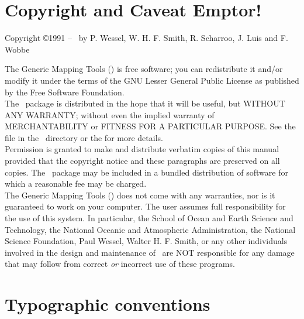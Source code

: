 
\chapter*{Copyright and Caveat Emptor!}

\begin{center}
Copyright \copyright 1991 -- \GMTDOCYEAR\ by P. Wessel, W. H. F. Smith, R. Scharroo, J. Luis and F. Wobbe
\end{center}

\vspace{\baselineskip}

The Generic Mapping Tools (\GMT) is free software; you can redistribute
it and/or modify it under the terms of the GNU Lesser General Public License
as published by the Free Software Foundation. \\

The \GMT\ package is distributed in the hope that it will be useful, but
WITHOUT ANY WARRANTY; without even the implied warranty of
MERCHANTABILITY or FITNESS FOR A PARTICULAR PURPOSE.  See the
file  in the \GMT\ directory or the
for more details. \\

Permission is granted to make and distribute verbatim copies of this
manual provided that the copyright notice and these paragraphs are
preserved on all copies.  The \GMT\ package may be included in a bundled
distribution of software for which a reasonable fee may be charged. \\

The Generic Mapping Tools (\GMT) does not come with any warranties,
nor is it guaranteed to work on your computer.  The user assumes full
responsibility for the use of this system. In particular, the School of
Ocean and Earth Science and Technology, the National Oceanic and
Atmospheric Administration, the National Science Foundation,
Paul Wessel, Walter H. F. Smith, or any other individuals involved in
the design and maintenance of \GMT\ are NOT responsible for any damage
that may follow from correct \emph{or} incorrect use of these programs.


\chapter*{Typographic conventions}

